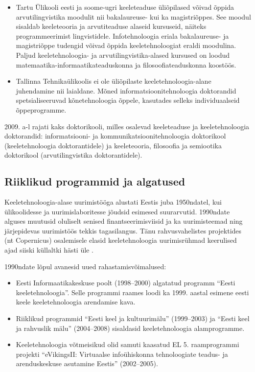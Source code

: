 \begin{multicols}{2}
\begin{itemize}
\item Tartu Ülikooli eesti ja soome-ugri keeleteaduse üliõpilased võivad õppida arvutilingvistika moodulit nii bakalaureuse- kui ka magistriõppes.  See moodul sisaldab keeleteooria ja arvutiteaduse alaseid kursuseid, näiteks programmeerimist lingvistidele.  Infotehnoloogia eriala bakalaureuse- ja magistriõppe tudengid võivad õppida keeletehnoloogiat eraldi moodulina.  Paljud keeletehnoloogia- ja arvutilingvistika-alased kursused on loodud matemaatika-informaatikateaduskonna ja filosoofiateaduskonna koostöös.
\item Tallinna Tehnikaülikoolis ei ole üliõpilaste keeletehnoloogia-alane juhendamine nii laialdane.  Mõned informatsioonitehnoloogia doktorandid spetsialiseeruvad kõnetehnoloogia õppele, kasutades selleks indivi\-duaal\-seid õppeprogramme.  
\end{itemize}
  
2009. a-l rajati kaks doktorikooli, milles osalevad keeleteaduse ja keele\-tehnoloogia doktorandid: informatsiooni- ja kommu\-ni\-kat\-siooni\-tehnoloogia doktorikool (keele\-tehnoloogia doktorantidele) ja keele\-teooria, filosoofia ja semiootika doktorikool (arvutilingvistika doktorantidele).

\subsection{Riiklikud programmid ja algatused}

Keeletehnoloogia-alase uurimistööga alustati Eestis juba 1950ndatel, kui ülikoolidesse ja uurimislaboritesse jõudsid esimesed suurarvutid. 
1990ndate alguses muutusid oluliselt senised finantseerimisviisid ja ka uurimisteemad ning järjepidevas uurimistöös tekkis tagasilangus. 
Tänu rahvusvahelistes projektides (nt Copernicus) osalemisele elasid keeletehnoloogia uurimisrühmad keerulised ajad siiski küllaltki hästi üle \cite{Meisteretal}.

1990ndate lõpul avanesid uued rahastamisvõimalused:

\begin{itemize}
\item Eesti Informaatikakeskuse poolt (1998--2000) algatatud programm ``Eesti keeletehnoloogia''. Selle programmi raames loodi ka 1999. aastal esimene eesti keele keeletehnoloogia arendamise kava.
\item Riiklikud programmid ``Eesti keel ja kultuurimälu''
   (1999--2003) ja ``Eesti keel ja rahvuslik mälu'' (2004--2008)
   sisaldasid keeletehnoloogia alamprogramme.
\item Keeletehnoloogia võtmeisikud olid samuti kaasatud EL 5. raam\-prog\-rammi projekti ``eVikingsII: Virtuaalse infoühiskonna tehnoloogiate teadus- ja arenduskeskuse asutamine Eestis'' (2002--2005).  \end{itemize}


\end{multicols}
